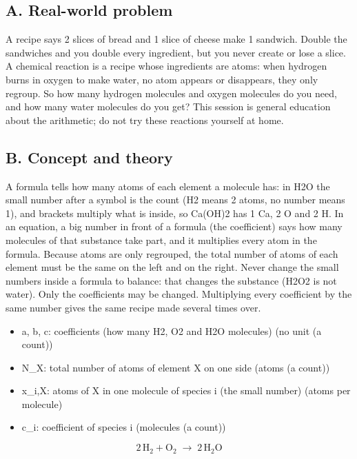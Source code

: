 \documentclass[11pt,a4paper]{article}
\begin{document}
\subsection*{A. Real-world problem}
A recipe says 2 slices of bread and 1 slice of cheese make 1 sandwich. Double the sandwiches and you double every ingredient, but you never create or lose a slice. A chemical reaction is a recipe whose ingredients are atoms: when hydrogen burns in oxygen to make water, no atom appears or disappears, they only regroup. So how many hydrogen molecules and oxygen molecules do you need, and how many water molecules do you get? This session is general education about the arithmetic; do not try these reactions yourself at home.

\subsection*{B. Concept and theory}
A formula tells how many atoms of each element a molecule has: in H2O the small number after a symbol is the count (H2 means 2 atoms, no number means 1), and brackets multiply what is inside, so Ca(OH)2 has 1 Ca, 2 O and 2 H. In an equation, a big number in front of a formula (the coefficient) says how many molecules of that substance take part, and it multiplies every atom in the formula. Because atoms are only regrouped, the total number of atoms of each element must be the same on the left and on the right. Never change the small numbers inside a formula to balance: that changes the substance (H2O2 is not water). Only the coefficients may be changed. Multiplying every coefficient by the same number gives the same recipe made several times over.

\begin{itemize}[nosep]
\item a, b, c: coefficients (how many H2, O2 and H2O molecules) (no unit (a count))
\item N\_X: total number of atoms of element X on one side (atoms (a count))
\item x\_i,X: atoms of X in one molecule of species i (the small number) (atoms per molecule)
\item c\_i: coefficient of species i (molecules (a count))
\end{itemize}

\begin{equation*}
2\,\mathrm{H_2}+\mathrm{O_2}\;\longrightarrow\;2\,\mathrm{H_2O}
\end{equation*}
\end{document}
